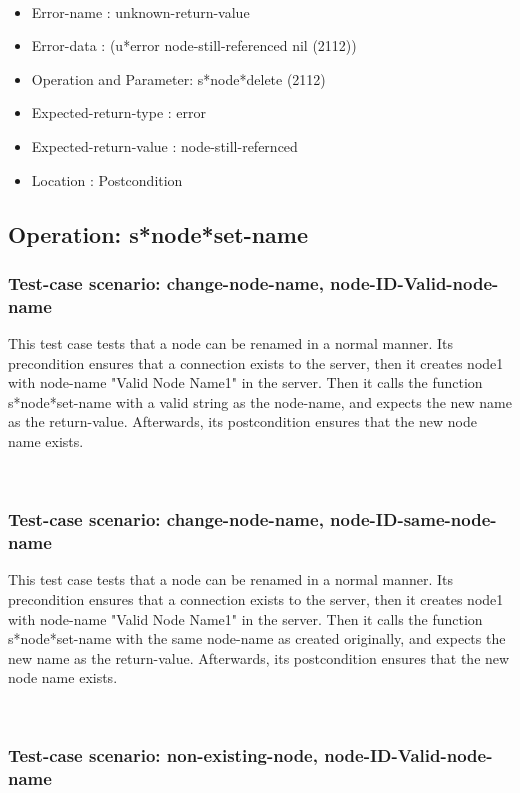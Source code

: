 \
\begin {itemize}
\item 	Error-name             : unknown-return-value
\item Error-data             : (u*error node-still-referenced nil (2112))
\item Operation and Parameter: s*node*delete (2112)
\item Expected-return-type   : error
\item Expected-return-value  : node-still-refernced
\item Location               : Postcondition



\end {itemize}
\subsection {Operation: s*node*set-name}
\subsubsection {Test-case scenario: change-node-name, node-ID-Valid-node-name}


This test case tests that a node can be renamed in a normal manner.
Its precondition ensures that a connection exists to the server, then it creates node1 with node-name "Valid Node Name1" in the server.
Then it calls the function s*node*set-name  with a valid string as the node-name, and expects the new name as the return-value.
Afterwards, its postcondition ensures that the new node name exists.




\
\subsubsection {Test-case scenario: change-node-name, node-ID-same-node-name}


This test case tests that a node can be renamed in a normal manner.
Its precondition ensures that a connection exists to the server, then it creates node1 with node-name "Valid Node Name1" in the server.
Then it calls the function s*node*set-name  with the same node-name as created originally, and expects the new name as the return-value.
Afterwards, its postcondition ensures that the new node name exists.




\
\subsubsection {Test-case scenario: non-existing-node, node-ID-Valid-node-name}


